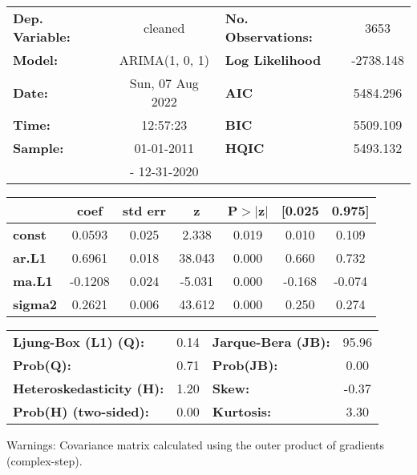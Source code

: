 \begin{center}
\begin{tabular}{lclc}
\toprule
\textbf{Dep. Variable:}          &     cleaned      & \textbf{  No. Observations:  } &    3653     \\
\textbf{Model:}                  &  ARIMA(1, 0, 1)  & \textbf{  Log Likelihood     } & -2738.148   \\
\textbf{Date:}                   & Sun, 07 Aug 2022 & \textbf{  AIC                } &  5484.296   \\
\textbf{Time:}                   &     12:57:23     & \textbf{  BIC                } &  5509.109   \\
\textbf{Sample:}                 &    01-01-2011    & \textbf{  HQIC               } &  5493.132   \\
\textbf{}                        &   - 12-31-2020   & \textbf{                     } &             \\
\bottomrule
\end{tabular}
\begin{tabular}{lcccccc}
                & \textbf{coef} & \textbf{std err} & \textbf{z} & \textbf{P$> |$z$|$} & \textbf{[0.025} & \textbf{0.975]}  \\
\midrule
\textbf{const}  &       0.0593  &        0.025     &     2.338  &         0.019        &        0.010    &        0.109     \\
\textbf{ar.L1}  &       0.6961  &        0.018     &    38.043  &         0.000        &        0.660    &        0.732     \\
\textbf{ma.L1}  &      -0.1208  &        0.024     &    -5.031  &         0.000        &       -0.168    &       -0.074     \\
\textbf{sigma2} &       0.2621  &        0.006     &    43.612  &         0.000        &        0.250    &        0.274     \\
\bottomrule
\end{tabular}
\begin{tabular}{lclc}
\textbf{Ljung-Box (L1) (Q):}     & 0.14 & \textbf{  Jarque-Bera (JB):  } & 95.96  \\
\textbf{Prob(Q):}                & 0.71 & \textbf{  Prob(JB):          } &  0.00  \\
\textbf{Heteroskedasticity (H):} & 1.20 & \textbf{  Skew:              } & -0.37  \\
\textbf{Prob(H) (two-sided):}    & 0.00 & \textbf{  Kurtosis:          } &  3.30  \\
\bottomrule
\end{tabular}
\end{center}

Warnings: \newline
 [1] Covariance matrix calculated using the outer product of gradients (complex-step).